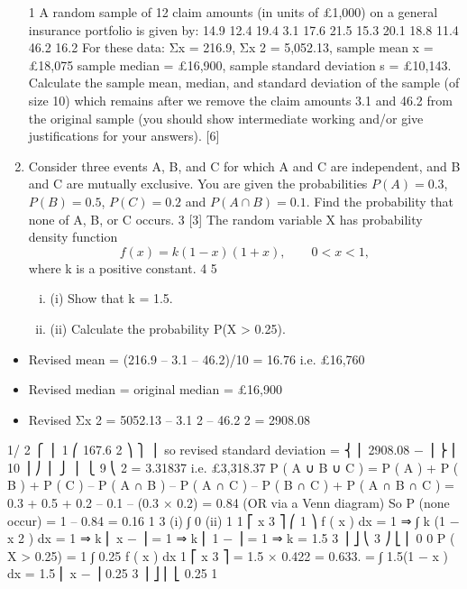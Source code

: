 \documentclass[a4paper,12pt]{article}
\begin{document}
\begin{enumerate}
1
A random sample of 12 claim amounts (in units of £1,000) on a general insurance
portfolio is given by:
14.9
12.4
19.4
3.1
17.6
21.5
15.3
20.1
18.8
11.4
46.2
16.2
For these data: Σx = 216.9, Σx 2 = 5,052.13, sample mean x = £18,075
sample median = £16,900, sample standard deviation s = £10,143.
Calculate the sample mean, median, and standard deviation of the sample (of size 10)
which remains after we remove the claim amounts 3.1 and 46.2 from the original
sample (you should show intermediate working and/or give justifications for your answers).
[6]
\item Consider three events A, B, and C for which A and C are independent, and B and C are
mutually exclusive. You are given the probabilities $P(A) = 0.3$, $P(B) = 0.5$, $P(C) = 0.2$
and $P(A\cap B) = 0.1$.
Find the probability that none of A, B, or C occurs.
3
[3]
The random variable X has probability density function
\[f ( x ) = k (1 − x )(1 + x ),
\qquad 0 < x < 1 ,\]
where k is a positive constant.
4
5
\begin{enumerate}[(i)]
\item (i) Show that k = 1.5.
\item (ii) Calculate the probability P(X > 0.25).
\end{enumerate}

\end{enumerate}
\begin{itemize}
\item Revised mean = (216.9 – 3.1 – 46.2)/10 = 16.76 i.e. £16,760
\item Revised median = original median = £16,900
\item Revised Σx 2 = 5052.13 – 3.1 2 – 46.2 2 = 2908.08
\end{itemize}
1/ 2
⎧ ⎪ 1 ⎛
167.6 2 ⎞ ⎫ ⎪
so revised standard deviation = ⎨ ⎜ 2908.08 −
⎟ ⎬
⎜
10 ⎟ ⎠ ⎪ ⎭
⎪ ⎩ 9 ⎝
2
= 3.31837 i.e. £3,318.37
P ( A ∪ B ∪ C ) = P ( A ) + P ( B ) + P ( C ) – P ( A ∩ B ) – P ( A ∩ C ) – P ( B ∩ C ) + P ( A ∩ B ∩ C )
= 0.3 + 0.5 + 0.2 – 0.1 – (0.3 × 0.2) = 0.84
(OR via a Venn diagram)
So P (none occur) = 1 – 0.84 = 0.16
1
3
(i)
∫
0
(ii)
1
1
⎡
x 3 ⎤
⎛ 1 ⎞
f ( x ) dx = 1 ⇒ ∫ k (1 − x 2 ) dx = 1 ⇒ k ⎢ x − ⎥ = 1 ⇒ k ⎜ 1 − ⎟ = 1 ⇒ k = 1.5
3 ⎥ ⎦
⎝ 3 ⎠
⎣ ⎢
0
0
P ( X > 0.25) =
1
∫ 0.25 f ( x ) dx
1
⎡
x 3 ⎤
= 1.5 × 0.422 = 0.633.
= ∫ 1.5(1 − x ) dx = 1.5 ⎢ x − ⎥
0.25
3 ⎥ ⎦
⎢ ⎣
0.25
1
\end{document}
